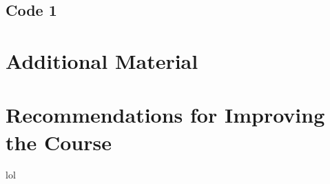 \documentclass[]{book}
\begin{document}
\section{Code 1}

\chapter{Additional Material}














\begin{landscape}

\end{landscape}
\chapter{Recommendations for Improving the Course}
lol
\end{document}
